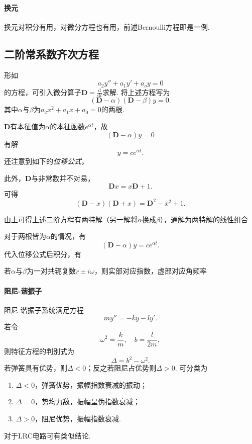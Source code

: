 \documentclass[UTF-8]{ctexart}
\newcommand{\dt}[1]{\frac{\mathrm{d}#1}{\mathrm{d}t}}
\newcommand{\pare}[1]{\left(#1\right)}
\newcommand{\DD}{\mathbf{D}}
\newtheorem{reflection}{反射}
\newcommand{\refl}[1]{\vspace{0.5em}\par\noindent\fbox{%
    \parbox{\textwidth}{%
    \begin{reflection}
        #1
    \end{reflection}
    }%
}\vspace{0.5em}\par}
\begin{document}
  \paragraph{换元}换元对积分有用，对微分方程也有用，前述Bernoulli方程即是一例.
  \subsection{二阶常系数齐次方程}
  形如
  \[ a_2 y'' + a_1 y' + a_o y = 0 \]
  的方程，可引入微分算子$\DD = \dt{}$求解. 将上述方程写为
  \[ \pare{\DD-\alpha}\pare{\DD-\beta}y = 0. \]
  其中$\alpha$与$\beta$为$a_2 x^2 + a_1 x + a_0 = 0$的两根.
  \par
  $\DD$有本征值为$\alpha$的本征函数$e^{\alpha t}$，故
  \[ \pare{\DD-\alpha}y=0 \]
  有解
  \[ y=ce^{\alpha t}. \]
  还注意到如下的\emph{位移公式}，
  \refl{
    \[\pare{\DD-\alpha} = e^{\DD\alpha t} \DD e^{-\alpha t}.\]
  }
  此外，$\DD$与非常数并不对易，
  \[ \DD x = x\DD + 1. \]
  可得
  \begin{equation}
    \label{eq:dpmx}
    \pare{\DD-x}\pare{\DD+x} = \DD^2-x^2+1.
  \end{equation}
  \par
  由上可得上述二阶方程有两特解（另一解将$\alpha$换成$\beta$），通解为两特解的线性组合
  \refl{
  \[ y=c_1 e^{\alpha t} + c_2 e^{\beta t}. \]
  }
  \par
  对于两根皆为$\alpha$的情况，有
  \[ \pare{\DD-\alpha}y = ce^{\alpha t}. \]
  代入位移公式后积分，有
  \refl{
  \[ y = \pare{c_1x + c_2}e^{\alpha t}. \]
  }
  若$\alpha$与$\beta$为一对共轭复数$r \pm i\omega$，则实部对应指数，虚部对应角频率
  \refl{
  \[ y=e^{rt}\pare{c_1 \sin \omega t + c_2 \cos \omega t} = ce^{rt}\sin\pare{\omega t + \varphi}. \]}
  \paragraph{阻尼-谐振子}阻尼-谐振子系统满足方程
  \label{par:hd}
  \[ my''=-ky-ly'. \]
  若令
  \[ \omega^2 = \frac{k}{m}, \quad b = \frac{l}{2m}, \]
  则特征方程的判别式为
  \[ \Delta = b^2 - \omega^2. \]
  若弹簧具有优势，则$\Delta < 0$；反之若阻尼占优势则$\Delta > 0$. 可分类为
  \begin{enumerate}
    \item $\Delta < 0$，弹簧优势，振幅指数衰减的振动；
    \item $\Delta = 0$，势均力敌，振幅呈伪指数衰减；
    \item $\Delta > 0$，阻尼优势，振幅指数衰减.
  \end{enumerate}
  对于LRC电路可有类似结论.
\end{document}

